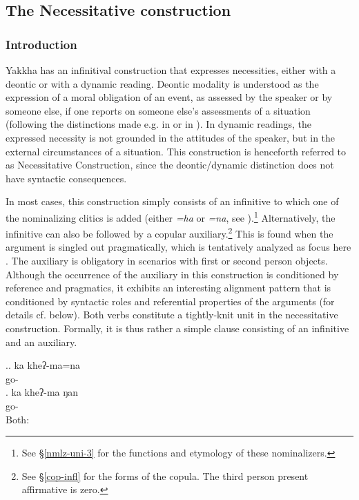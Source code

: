\subsection{The Necessitative construction}\label{obl}

\subsubsection{Introduction}
Yakkha has an infinitival construction that expresses necessities, either with a deontic or with a dynamic reading. Deontic modality is understood as the expression of a moral obligation of an event, as assessed by the speaker or by someone else, if one reports on someone else's assessments of a situation (following the distinctions made e.g. in \citet[2]{Nuyts2006_Modality} or in \citet[12]{Vanlinden2012_Modal}). In  dynamic readings, the expressed necessity is not grounded in the attitudes of the speaker, but in the external circumstances of a situation.  This construction is henceforth referred to as Necessitative Construction, since the deontic/dynamic distinction does not have syntactic consequences.

In most cases, this construction simply consists of an infinitive  to which one of the nominalizing clitics is added (either \emph{=ha} or \emph{=na}, see \Next[a]).\footnote{See §\ref{nmlz-uni-3} for the functions and etymology of these nominalizers.}  Alternatively, the infinitive can also be followed by a copular auxiliary.\footnote{See §\ref{cop-infl} for the forms of the copula. The third person present affirmative is zero.} This is found when the argument is singled out pragmatically, which is tentatively analyzed as focus here \Next[b]. The auxiliary is obligatory in scenarios with first or second person objects. Although the occurrence of the auxiliary in this construction is conditioned by reference and pragmatics, it exhibits an interesting alignment pattern that is conditioned by syntactic roles and referential properties of the arguments (for details cf. below). Both verbs constitute a tightly-knit unit in the necessitative construction. Formally,  it is thus rather a simple clause consisting of an infinitive and an auxiliary. 

\ex.\ag. ka kheʔ-ma=na\\
 go- \\
\bg. ka kheʔ-ma ŋan\\
 go-  \\
Both:  


